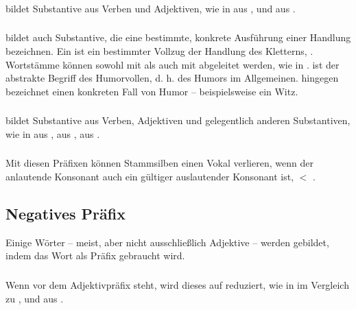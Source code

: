 \subsubsection{}  bildet Substantive aus Verben und Adjektiven, wie in   aus , und   aus  . 

\subsubsection{}  bildet auch Substantive, die eine bestimmte, konkrete Ausführung einer Handlung bezeichnen. Ein   ist ein bestimmter Vollzug der Handlung des Kletterns, . Wortstämme können sowohl mit  als auch mit  abgeleitet werden, wie in  .  ist der abstrakte Begriff des Humorvollen, d. h. des Humors im Allgemeinen.  hingegen bezeichnet einen konkreten Fall von Humor -- beispielsweise ein Witz. 

\subsubsection{}  bildet Substantive aus Verben, Adjektiven und gelegentlich anderen Substantiven, wie in   aus  ,   aus  ,   aus  . 

\subsubsection{} Mit diesen Präfixen können Stammsilben einen Vokal verlieren, wenn der anlautende Konsonant auch ein gültiger auslautender Konsonant ist,   $<$  .

\subsection{Negatives Präfix} Einige Wörter -- meist, aber nicht ausschließlich Adjektive -- werden gebildet, indem das Wort   als Präfix gebraucht wird.

\subsubsection{} Wenn  vor dem Adjektivpräfix  steht, wird dieses auf  reduziert, wie in   im Vergleich zu  , und   aus  .

